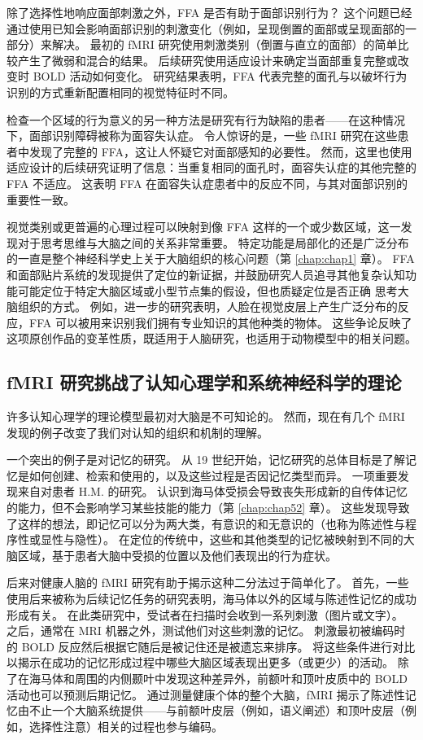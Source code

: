 除了选择性地响应面部刺激之外，FFA 是否有助于面部识别行为？ 
这个问题已经通过使用已知会影响面部识别的刺激变化（例如，呈现倒置的面部或呈现面部的一部分）来解决。 
最初的 fMRI 研究使用刺激类别（倒置与直立的面部）的简单比较产生了微弱和混合的结果。 
后续研究使用适应设计来确定当面部重复完整或改变时 BOLD 活动如何变化。 
研究结果表明，FFA 代表完整的面孔与以破坏行为识别的方式重新配置相同的视觉特征时不同。


检查一个区域的行为意义的另一种方法是研究有行为缺陷的患者——在这种情况下，面部识别障碍被称为面容失认症。 
令人惊讶的是，一些 fMRI 研究在这些患者中发现了完整的 FFA，这让人怀疑它对面部感知的必要性。 
然而，这里也使用适应设计的后续研究证明了信息：当重复相同的面孔时，面容失认症的其他完整的 FFA 不适应。 
这表明 FFA 在面容失认症患者中的反应不同，与其对面部识别的重要性一致。


视觉类别或更普遍的心理过程可以映射到像 FFA 这样的一个或少数区域，这一发现对于思考思维与大脑之间的关系非常重要。 
特定功能是局部化的还是广泛分布的一直是整个神经科学史上关于大脑组织的核心问题（第 \ref{chap:chap1} 章）。 
FFA 和面部贴片系统的发现提供了定位的新证据，并鼓励研究人员追寻其他复杂认知功能可能定位于特定大脑区域或小型节点集的假设，但也质疑定位是否正确 思考大脑组织的方式。 
例如，进一步的研究表明，人脸在视觉皮层上产生广泛分布的反应，FFA 可以被用来识别我们拥有专业知识的其他种类的物体。 
这些争论反映了这项原创作品的变革性质，既适用于人脑研究，也适用于动物模型中的相关问题。


\subsection{fMRI 研究挑战了认知心理学和系统神经科学的理论}

许多认知心理学的理论模型最初对大脑是不可知论的。 
然而，现在有几个 fMRI 发现的例子改变了我们对认知的组织和机制的理解。


一个突出的例子是对记忆的研究。 
从 19 世纪开始，记忆研究的总体目标是了解记忆是如何创建、检索和使用的，以及这些过程是否因记忆类型而异。 
一项重要发现来自对患者 H.M. 的研究。 
认识到海马体受损会导致丧失形成新的自传体记忆的能力，但不会影响学习某些技能的能力（第 \ref{chap:chap52} 章）。 
这些发现导致了这样的想法，即记忆可以分为两大类，有意识的和无意识的（也称为陈述性与程序性或显性与隐性）。 
在定位的传统中，这些和其他类型的记忆被映射到不同的大脑区域，基于患者大脑中受损的位置以及他们表现出的行为症状。


后来对健康人脑的 fMRI 研究有助于揭示这种二分法过于简单化了。 
首先，一些使用后来被称为后续记忆任务的研究表明，海马体以外的区域与陈述性记忆的成功形成有关。 
在此类研究中，受试者在扫描时会收到一系列刺激（图片或文字）。 
之后，通常在 MRI 机器之外，测试他们对这些刺激的记忆。 
刺激最初被编码时的 BOLD 反应然后根据它随后是被记住还是被遗忘来排序。 
将这些条件进行对比以揭示在成功的记忆形成过程中哪些大脑区域表现出更多（或更少）的活动。 
除了在海马体和周围的内侧颞叶中发现这种差异外，前额叶和顶叶皮质中的 BOLD 活动也可以预测后期记忆。 
通过测量健康个体的整个大脑，fMRI 揭示了陈述性记忆由不止一个大脑系统提供——与前额叶皮层（例如，语义阐述）和顶叶皮层（例如，选择性注意）相关的过程也参与编码。


